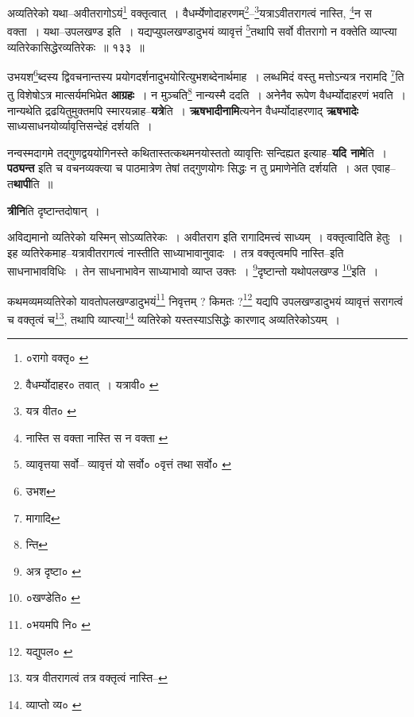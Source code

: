 \documentclass[article,12pt,a4paper]{memoir}
\begin{document}
	  \bigskip
	  \begingroup
	

	  \pstart अव्यतिरेको यथा--अवीतरागोऽयं\footnote{०रागो वक्तृ० \cite{dp-msD} \cite{dp-msB} \cite{dp-edP} \cite{dp-edH} \cite{dp-edE} \cite{dp-edN}} वक्तृत्वात् । वैधर्म्येणोदाहरणम्\footnote{वैधर्म्योदाहर० \cite{dp-msB} \cite{dp-edP} \cite{dp-edH} \cite{dp-edE} \cite{dp-edN} तवात् । यत्रावी० \cite{dp-msC}}--\footnote{यत्र वीत० \cite{dp-msB} \cite{dp-edP} \cite{dp-edH} \cite{dp-edE}}यत्राऽवीतरागत्वं नास्ति, \footnote{नास्ति स वक्ता \cite{dp-msB} \cite{dp-edP} \cite{dp-edH} \cite{dp-edE} नास्ति स न वक्ता \cite{dp-msC}}न स वक्ता । यथा--उपलखण्ड इति । यद्यप्युपलखण्डादुभयं व्यावृत्तं \footnote{व्यावृत्तया सर्वो--\cite{dp-msB} \cite{dp-edP} \cite{dp-edH} व्यावृत्तं यो सर्वो० \cite{dp-edE} ०वृत्तं तथा सर्वो० \cite{dp-msC}}तथापि सर्वो वीतरागो न वक्तेति व्याप्त्या व्यतिरेकासिद्धेरव्यतिरेकः ॥ १३३ ॥
	\pend
      
	  \endgroup
	
	  \endgroup
	

	  \pstart उभयश\footnote{उभश}ब्दस्य द्विवचनान्तस्य प्रयोगदर्शनादुभयोरित्युभशब्देनार्थमाह । लब्धमिदं वस्तु मत्तोऽन्यत्र नरामदि \footnote{मागादि}ति तु विशेषोऽत्र मात्सर्यमभिप्रेत \textbf{आग्रहः} । न मुञ्चति\footnote{न्ति} नान्यस्मै ददति । अनेनैव रूपेण वैधर्म्योदाहरणं भवति । नान्यथेति द्रढयितुमुक्तमपि स्मारयन्नाह--\textbf{यत्रे}ति । \textbf{ऋषभादीनामि}त्यनेन वैधर्म्योदाहरणाद् \textbf{ऋषभादेः} साध्यसाधनयोर्व्यावृत्तिसन्देहं दर्शयति ।
	\pend
      

	  \pstart नन्वस्मदागमे तद्गुणद्वययोगिनस्ते कथितास्तत्कथमनयोस्ततो व्यावृत्तिः सन्दिह्यत इत्याह--\textbf{यदि नामे}ति । \textbf{पठ्यन्त} इति च वचनव्यक्त्या च पाठमात्रेण तेषां तद्गुणयोगः सिद्धः न तु प्रमाणेनेति दर्शयति । अत एवाह--त\textbf{थापी}ति ॥
	\pend
      

	  \pstart \textbf{त्रीनि}ति दृष्टान्तदोषान् ।
	\pend
      \leavevmode{}
	  \bigskip
	  \begingroup
	

	  \pstart अविद्यमानो व्यतिरेको यस्मिन् सोऽव्यतिरेकः । अवीतराग इति रागादिमत्त्वं साध्यम् । वक्तृत्वादिति हेतुः । इह व्यतिरेकमाह--यत्रावीतरागत्वं नास्तीति साध्याभावानुवादः । तत्र वक्तृत्वमपि नास्ति--इति साधनाभावविधिः । तेन साधनाभावेन साध्याभावो व्याप्त उक्तः । \footnote{अत्र दृष्टा० \cite{dp-msD}}दृष्टान्तो यथोपलखण्ड \footnote{०खण्डेति० \cite{dp-msA} \cite{dp-msB} \cite{dp-edP} \cite{dp-edH}}इति ।
	\pend
       

	  \pstart कथमव्यमव्यतिरेको यावतोपलखण्डादुभयं\footnote{०भयमपि नि० \cite{dp-msD}} निवृत्तम् ? किमतः ?\footnote{यद्युपल० \cite{dp-msA} \cite{dp-msB} \cite{dp-edP} \cite{dp-edH} \cite{dp-edE}} यद्यपि उपलखण्डादुभयं व्यावृत्तं सरागत्वं च वक्तृत्वं च\footnote{यत्र वीतरागत्वं तत्र वक्तृत्वं नास्ति--\cite{dp-msD-n}}, तथापि व्याप्त्या\footnote{व्याप्तो व्य० \cite{dp-msC}} व्यतिरेको यस्तस्याऽसिद्धेः कारणाद् अव्यतिरेकोऽयम् ।
	\pend
       
\end{document}

